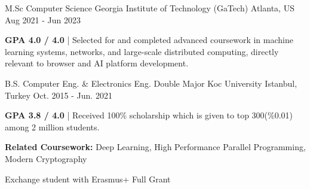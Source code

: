\begin{cventries}

\cvopenentry
    {M.Sc Computer Science } %
    {Georgia Institute of Technology (GaTech)} %
    {Atlanta, US} %
    {Aug 2021 - Jun 2023} %
    {\begin{cvghostitems} %
        \item {\textbf{GPA 4.0 / 4.0} | Selected for and completed advanced coursework in machine learning systems, networks, and large-scale \newline distributed computing, directly relevant to browser and AI platform development.}
      \end{cvghostitems}
    }
\cvopenentry
    {B.S. Computer Eng. \& Electronics Eng. Double Major} %
    {Koc University } %
    {Istanbul, Turkey} %
    {Oct. 2015 - Jun. 2021} %
    {
      \begin{cvitems} %
        \item {\textbf{GPA 3.8 / 4.0} | Received 100\% scholarship which is given to top 300(\%0.01) among 2 million students.}
        \item {\textbf{Related Coursework:} Deep Learning, High Performance Parallel Programming, Modern Cryptography}
      \end{cvitems}
    }
\cvopenentry
    {Exchange student with Erasmus+ Full Grant }

\end{cventries}
